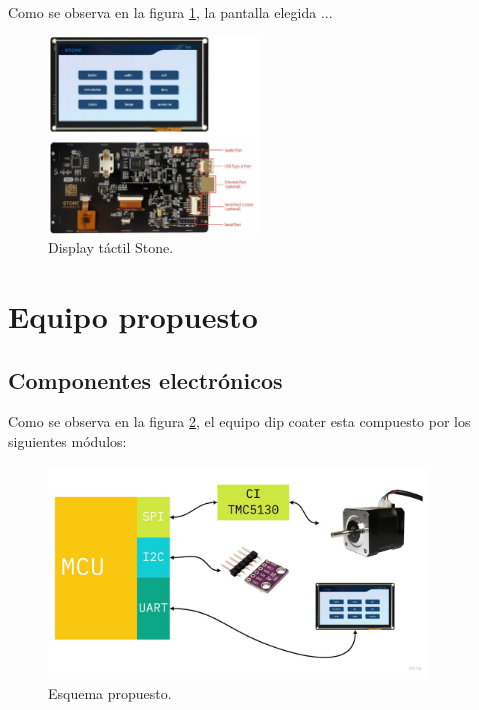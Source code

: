 Como se observa en la figura \ref{fig:stone}, la pantalla elegida ...

\begin{figure}[ht]
\centering 
\includegraphics[width=0.5\textwidth]{./Figures/stone.png}
\caption{Display táctil Stone.}
\label{fig:stone}
\end{figure}


\section{Equipo propuesto}

\subsection{Componentes electrónicos}

Como se observa en la figura \ref{fig:equipo_propuesto}, el equipo dip coater  esta compuesto por los siguientes módulos: 

\begin{figure}[ht]
\centering 
\includegraphics[width=0.9\textwidth]{./Figures/cap2_esquema_propuesto.jpg}
\caption{Esquema propuesto.}
\label{fig:equipo_propuesto}
\end{figure}
\vspace{25px}


